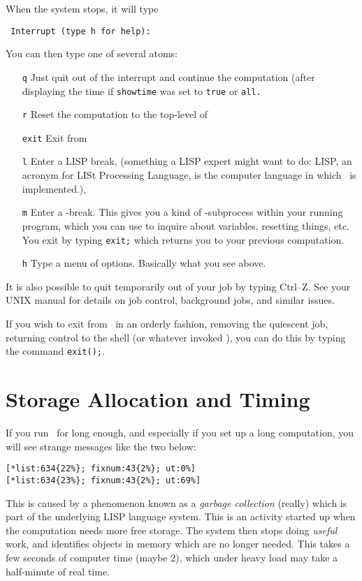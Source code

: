 When the system stops, it will type
\begin{verbatim}
 Interrupt (type h for help):
\end{verbatim}

You can then type one of several atoms:
\begin{itemize}

\item[{\tt q}]{Just quit out of the interrupt and continue the computation
(after displaying the time if {\tt  showtime} was set to {\tt true}
or {\tt  all.}}

\item[{\tt r}]{Reset the computation to the top-level of \Max\,}

\item[{\tt exit}]{Exit from \Max\,}

\item[{\tt l}]{Enter a LISP break, (something a LISP expert might want to do: 
LISP, an acronym for LISt Processing Language, is the computer language
in which \Max\ is implemented.),}

\item[{\tt m}]{Enter a \Max-break.  This gives you a kind of \Max-subprocess
within your running program, which you can use to inquire about variables,
resetting things, etc.  You exit by typing {\tt exit;}
which returns you to your previous computation.}

\item[{\tt h}]{Type a menu of options. Basically what you see above.}
\end{itemize}

It is also possible to quit temporarily out of your job by typing Ctrl--Z.
See your UNIX manual for details on job control, background jobs, and
similar issues. 

If you wish to exit from \Max\, in an orderly fashion, removing the 
quiescent job, returning control to the shell (or whatever invoked \Max),
you can do this by typing the command {\tt exit();}.

\section{Storage Allocation and Timing}
\label{gc}

If you run \Max\ for long enough, and especially if you set up a
long computation, you will see strange messages like the two below:
\begin{verbatim}
[*list:634{22%}; fixnum:43{2%}; ut:0%]
[*list:634{23%}; fixnum:43{2%}; ut:69%]
\end{verbatim}
This is caused by a phenomenon known as a {\it garbage collection}
(really) which is part of the underlying LISP language system.
This is an activity started up when the computation needs more
free storage. The system then stops doing {\it useful} work, and identifies
objects in memory which are no longer needed.  This takes a few
seconds of computer time (maybe 2),
which under heavy load may take a half-minute of real time.

